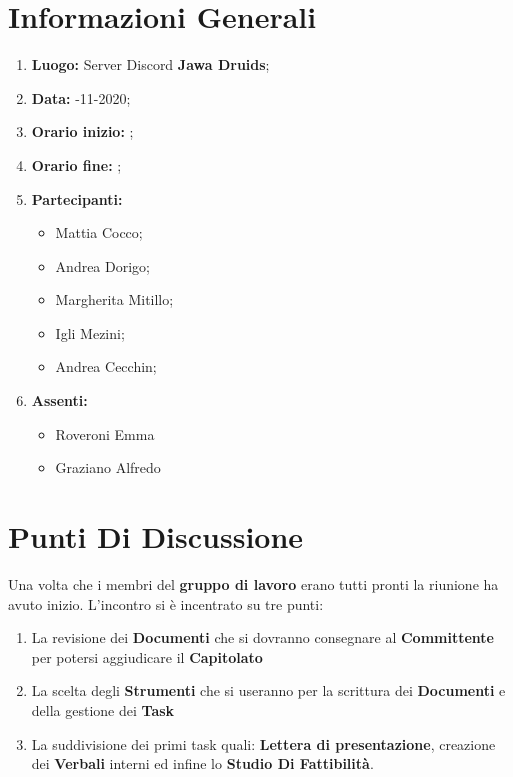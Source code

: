 \newpage
	\chapter{Informazioni Generali}
	\begin{enumerate}
		\item \textbf{Luogo:} \normalfont Server Discord \textbf{Jawa Druids};
		\item \textbf{Data:} -11-2020;
		\item \textbf{Orario inizio:} ;
		\item \textbf{Orario fine:} ;
		\item \textbf{Partecipanti:}
		\begin{itemize}
			\item Mattia Cocco; 
			\item Andrea Dorigo;
			\item Margherita Mitillo;
			\item Igli Mezini;
			\item Andrea Cecchin;
		\end{itemize}
		\item \textbf{Assenti:}
		\begin{itemize}
			\item Roveroni Emma
			\item Graziano Alfredo
		\end{itemize}
	\end{enumerate}
	\newpage
	\chapter{Punti Di Discussione}
	Una volta che i membri del \textbf{gruppo di lavoro} erano tutti pronti la riunione ha avuto inizio.
	L'incontro si è incentrato su tre punti:
	\begin{enumerate}
		\item La revisione dei \textbf{Documenti} che si dovranno consegnare al \textbf{Committente} per potersi aggiudicare il \textbf{Capitolato}
		
		\item La scelta degli \textbf{Strumenti} che si useranno per la scrittura dei \textbf{Documenti} e della gestione dei \textbf{Task}
		
		\item La suddivisione dei primi task quali: \textbf{Lettera di presentazione}, creazione dei \textbf{Verbali} interni ed infine lo \textbf{Studio Di Fattibilità}.
	\end{enumerate}

